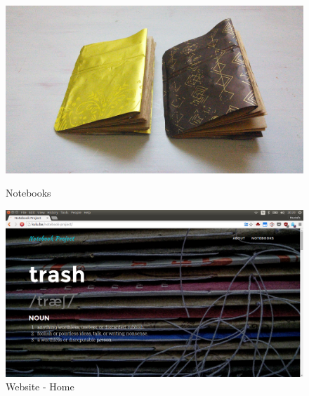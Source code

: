 \begin{figure}[!tbp]
  \centering
  \begin{minipage}[b]{0.48\textwidth}
    \includegraphics[width=\textwidth]{project_graphics/notebooks3.jpg}
    \caption{Notebooks}
    \label{fig:Notebooks3}
  \end{minipage}
  \hfill
  \begin{minipage}[b]{0.48\textwidth}
    \includegraphics[width=\textwidth]{project_graphics/website_home.png}
    \caption{Website - Home}
    \label{fig:WebsiteHome}
  \end{minipage}
\end{figure}


